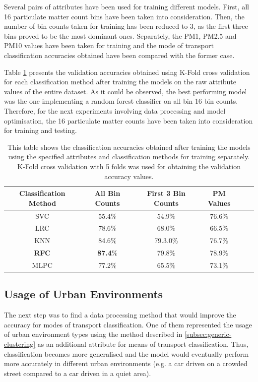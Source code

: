 \documentclass[bsc,frontabs,twoside,singlespacing, parskip,deptreport]{infthesis}     %
\begin{document}
Several pairs of attributes have been used for training different models. First, all 16 particulate matter count bins have been taken into consideration. Then, the number of bin counts taken for training has been reduced to 3, as the first three bins proved to be the most dominant ones. Separately, the PM1, PM2.5 and PM10 values have been taken for training and the mode of transport classification accuracies obtained have been compared with the former case. 

Table \ref{table:abs-values-models} presents the validation accuracies obtained using K-Fold cross validation for each classification method after training the models on the raw attribute values of the entire dataset. As it could be observed, the best performing model was the one implementing a random forest classifier on all bin 16 bin counts. Therefore, for the next experiments involving data processing and model optimisation, the 16 particulate matter counts have been taken into consideration for training and testing.

\begin{table}[h!]
\centering
 \begin{tabular}{||c | c | c | c | c | c||} 
 \hline
 Classification Method & All Bin Counts & First 3 Bin Counts & PM Values \\ [0.5ex] 
 \hline\hline
 SVC & 55.4\% & 54.9\% & 76.6\% \\ 
 \hline
 LRC & 78.6\% & 68.0\% & 66.5\% \\
 \hline
 KNN & 84.6\% & 79.3.0\% & 76.7\% \\ 
 \hline
 \textbf{RFC} & \textbf{87.4}\% & 79.8\% & 78.9\% \\ 
 \hline
  MLPC & 77.2\% & 65.5\% & 73.1\% \\ 
 \hline
\end{tabular}
\caption{This table shows the classification accuracies obtained after training the models using the specified attributes and classification methods for training separately. K-Fold cross validation with 5 folds was used for obtaining the validation accuracy values.}
\label{table:abs-values-models}
\end{table}


\subsection{Usage of Urban Environments}
\label{subsec:results-urban-env-use}

The next step was to find a data processing method that would improve the accuracy for modes of transport classification. One of them represented the usage of urban environment types using the method described in \ref{subsec:generic-clustering} as an additional attribute for means of transport classification. Thus, classification becomes more generalised and the model would eventually perform more accurately in different urban environments (e.g. a car driven on a crowded street compared to a car driven in a quiet area).
\end{document}
